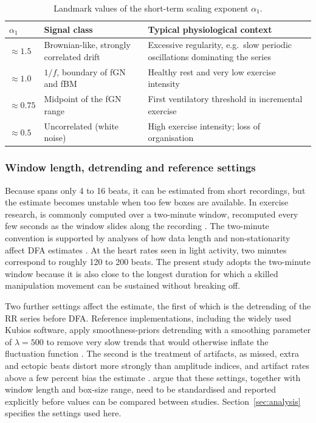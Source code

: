 \begin{table}[ht]
\centering
\caption{Landmark values of the short-term scaling exponent $\alpha_1$.}
\label{tab:alpha-landmarks}
\small
\begin{tabularx}{\textwidth}{l X X}
\toprule
$\alpha_1$ & Signal class & Typical physiological context \\
\midrule
$\approx 1.5$ & Brownian-like, strongly correlated drift & Excessive regularity, e.g.\ slow periodic oscillations dominating the series \citep{goldberger2002} \\
$\approx 1.0$ & $1/f$, boundary of fGN and fBM & Healthy rest and very low exercise intensity \citep{gronwald2020biomarker} \\
$\approx 0.75$ & Midpoint of the fGN range & First ventilatory threshold in incremental exercise \citep{rogers2021threshold} \\
$\approx 0.5$ & Uncorrelated (white noise) & High exercise intensity; loss of organisation \citep{gronwald2020review} \\
\bottomrule
\end{tabularx}
\end{table}

\subsubsection{Window length, detrending and reference settings}

Because \al{} spans only 4 to 16 beats, it can be estimated from short recordings, but the estimate becomes unstable when too few boxes are available. In exercise research, \al{} is commonly computed over a two-minute window, recomputed every few seconds as the window slides along the recording \citep{rogers2021threshold,rogers2022update}. The two-minute convention is supported by analyses of how data length and non-stationarity affect DFA estimates \citep{chen2002} . At the heart rates seen in light activity, two minutes correspond to roughly 120 to 200 beats. The present study adopts the two-minute window because it is also close to the longest duration for which a skilled manipulation movement can be sustained without breaking off.

Two further settings affect the estimate, the first of which is the detrending of the RR series before DFA. Reference implementations, including the widely used Kubios software, apply smoothness-priors detrending \citep{tarvainen2002} with a smoothing parameter of $\lambda = 500$ to remove very slow trends that would otherwise inflate the fluctuation function \citep{rogers2022update}. The second is the treatment of artifacts, as missed, extra and ectopic beats distort \al{} more strongly than amplitude indices, and artifact rates above a few percent bias the estimate \citep{rogers2022update}. \citet{hoos2025} argue that these settings, together with window length and box-size range, need to be standardised and reported explicitly before \al{} values can be compared between studies. Section~\ref{sec:analysis} specifies the settings used here.

